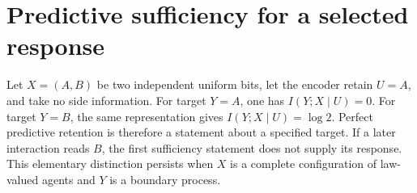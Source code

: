 \section{Predictive sufficiency for a selected response}

Let $X=(A,B)$ be two independent uniform bits, let the encoder retain $U=A$, and take no side information. For target $Y=A$, one has $I(Y;X\mid U)=0$. For target $Y=B$, the same representation gives $I(Y;X\mid U)=\log2$. Perfect predictive retention is therefore a statement about a specified target. If a later interaction reads $B$, the first sufficiency statement does not supply its response. This elementary distinction persists when $X$ is a complete configuration of law-valued agents and $Y$ is a boundary process.
